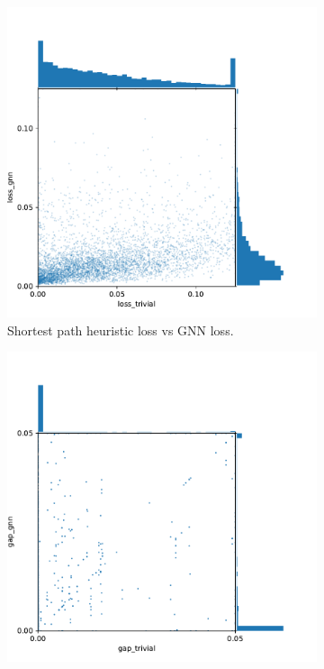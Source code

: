 \documentclass[english, 12pt, a4paper, sci, utf8, a-2b, online]{aaltothesis}
\begin{document}
\begin{figure}
    \begin{subfigure}{0.5\textwidth}
        \centering
        \includegraphics[width=\linewidth]{figures/loss-loss.pdf}
        \caption{Shortest path heuristic loss vs GNN loss.}
        \label{fig:results-ll}
    \end{subfigure}
    \begin{subfigure}{0.5\textwidth}
        \centering
        \includegraphics[width=\linewidth]{figures/gap-gap.pdf}

\end{subfigure}
\end{figure}
\end{document}
